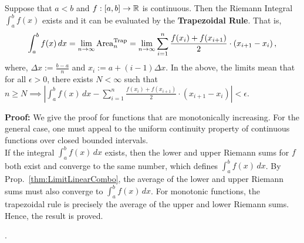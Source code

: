 \begin{tcolorbox}[title=\textcolor{black}{Proof of Prop.~\ref{thm:TrapezoidalRuleWorks} (Trapezoidal Rule for Computing a Riemann Integral)}, sharp corners, colback=green!30, colframe=green!80!blue, breakable, fonttitle=\bfseries]

Suppose that $a < b$ and $f:[a, b] \to \mathbb R$ is continuous. Then the Riemann Integral $\int_{a}^{b} f(x)$ exists and it can be evaluated by the \textbf{Trapezoidal Rule}. That is, 
$$
    \int_{a}^{b} f(x) \, dx= \lim_{n \to \infty}{\rm Area}^{\rm Trap}_n =   \lim_{n \to \infty}  \sum_{i=1}^n \frac{f(x_i) + f(x_{i+1})}{2} \cdot \left(x_{i+1} -x_i\right),
$$ 
where, $\Delta x:=\frac{b-a}{n}$ and $x_i:=a + (i-1) \Delta x$. In the above, the limits mean that for all $\epsilon>0$, there exists $N < \infty$ such that $n \ge N \implies \left| \int_{a}^{b} f(x) \, dx - \sum_{i=1}^n \frac{f(x_i) + f(x_{i+1})}{2} \cdot \left(x_{i+1} -x_i\right) \right| < \epsilon$.

\end{tcolorbox}

\bigskip
\textbf{Proof:} We give the proof for functions that are monotonically increasing. For the general case, one must appeal to the uniform continuity property of continuous functions over closed bounded intervals. \\

If the integral $ \int_{a}^{b} f(x) \, dx$ exists, then the lower and upper Riemann sums for $f$ both exist and converge to the same number, which defines  $\int_{a}^{b} f(x) \, dx$. By Prop.~\ref{thm:LimitLinearCombo}, the average of the lower and upper Riemann sums must also converge to $ \int_{a}^{b} f(x) \, dx$. For monotonic functions, the trapezoidal rule is precisely the average of the upper and lower Riemann sums. Hence, the result is proved.

\Qed.

\bigskip



